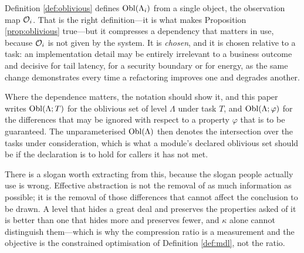 \begin{remark}\label{rmk:oblivious-relative}
Definition \ref{def:oblivious} defines $\operatorname{Obl}(\Lambda_i)$ from a single object, the observation map
$\mathcal{O}_i$. That is the right definition---it is what makes Proposition \ref{prop:oblivious} true---but
it compresses a dependency that matters in use, because $\mathcal{O}_i$ is not given by the system. It is
\emph{chosen}, and it is chosen relative to a task: an implementation detail may be entirely
irrelevant to a business outcome and decisive for tail latency, for a security boundary or for
energy, as the same change demonstrates every time a refactoring improves one and degrades another.

Where the dependence matters, the notation should show it, and this paper writes
$\operatorname{Obl}(\Lambda; T)$ for the oblivious set of level $\Lambda$ under task $T$, and
$\operatorname{Obl}(\Lambda; \varphi)$ for the differences that may be ignored with respect to a property
$\varphi$ that is to be guaranteed. The unparameterised $\operatorname{Obl}(\Lambda)$ then denotes the
intersection over the tasks under consideration, which is what a module's declared oblivious set
should be if the declaration is to hold for callers it has not met.

There is a slogan worth extracting from this, because the slogan people actually use is wrong.
Effective abstraction is not the removal of as much information as possible; it is the removal of
those differences that cannot affect the conclusion to be drawn. A level that hides a great deal and
preserves the properties asked of it is better than one that hides more and preserves fewer, and
$\kappa$ alone cannot distinguish them---which is why the compression ratio is a measurement and the
objective is the constrained optimisation of Definition \ref{def:mdl}, not the ratio.
\end{remark}

